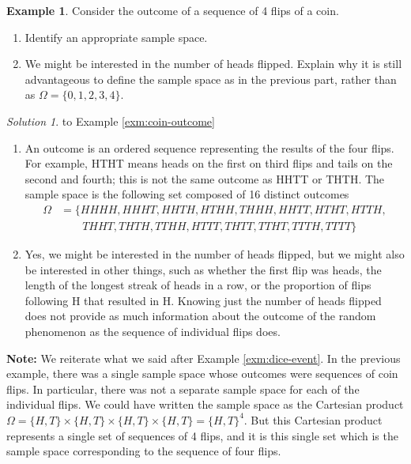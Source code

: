 \documentclass[
]{book}
\providecommand{\tightlist}{%
  \setlength{\itemsep}{0pt}\setlength{\parskip}{0pt}}
\theoremstyle{definition}
\theoremstyle{definition}
\newtheorem{example}{Example}[chapter]
\theoremstyle{definition}
\theoremstyle{remark}
\newtheorem*{solution}{Solution}
\begin{document}
\begin{example}
\protect\hypertarget{exm:coin-outcome}{}{\label{exm:coin-outcome} }
Consider the outcome of a sequence of 4 flips of a coin.
\end{example}

\begin{enumerate}
\def\labelenumi{\arabic{enumi}.}
\tightlist
\item
  Identify an appropriate sample space.
\item
  We might be interested in the number of heads flipped. Explain why it is still advantageous to define the sample space as in the previous part, rather than as \(\Omega=\{0, 1, 2, 3, 4\}\).
\end{enumerate}

\begin{solution}
{}to Example \ref{exm:coin-outcome}
\end{solution}

\begin{enumerate}
\def\labelenumi{\arabic{enumi}.}
\tightlist
\item
  An outcome is an ordered sequence representing the results of the four flips. For example, HTHT means heads on the first on third flips and tails on the second and fourth; this is not the same outcome as HHTT or THTH. The sample space is the following set composed of 16 distinct outcomes
  \begin{align*}
  \Omega & = \{HHHH, HHHT, HHTH, HTHH, THHH, HHTT, HTHT, HTTH,\\ 
  & \qquad THHT, THTH, TTHH, HTTT, THTT, TTHT, TTTH, TTTT\}
  \end{align*}
\item
  Yes, we might be interested in the number of heads flipped, but we might also be interested in other things, such as whether the first flip was heads, the length of the longest streak of heads in a row, or the proportion of flips following H that resulted in H. Knowing just the number of heads flipped does not provide as much information about the outcome of the random phenomenon as the sequence of individual flips does.
\end{enumerate}

\textbf{Note:} We reiterate what we said after Example \ref{exm:dice-event}. In the previous example, there was a single sample space whose outcomes were sequences of coin flips. In particular, there was not a separate sample space for each of the individual flips. We could have written the sample space as the Cartesian product \(\Omega = \{H, T\}\times \{H, T\}\times \{H, T\}\times \{H, T\} = \{H, T\}^4\). But this Cartesian product represents a single set of sequences of 4 flips, and it is this single set which is the sample space corresponding to the sequence of four flips.
\end{document}
